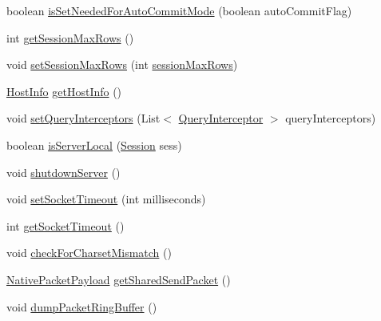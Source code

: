 \begin{DoxyCompactItemize}
\item 
boolean \mbox{\hyperlink{classcom_1_1mysql_1_1cj_1_1_native_session_a6c17459969e6753f0b81ebe4ad6dfeea}{is\+Set\+Needed\+For\+Auto\+Commit\+Mode}} (boolean auto\+Commit\+Flag)
\item 
int \mbox{\hyperlink{classcom_1_1mysql_1_1cj_1_1_native_session_acfb2e9bb55f978d62b41814adbaf940d}{get\+Session\+Max\+Rows}} ()
\item 
void \mbox{\hyperlink{classcom_1_1mysql_1_1cj_1_1_native_session_a2a00f7d68bbd14f1e9b1ab4509cef54b}{set\+Session\+Max\+Rows}} (int \mbox{\hyperlink{classcom_1_1mysql_1_1cj_1_1_core_session_a6206b6d3a13ba61a394fd6ab6e93eafc}{session\+Max\+Rows}})
\item 
\mbox{\hyperlink{classcom_1_1mysql_1_1cj_1_1conf_1_1_host_info}{Host\+Info}} \mbox{\hyperlink{classcom_1_1mysql_1_1cj_1_1_native_session_a9a6129d65239775a738e640addb8d9db}{get\+Host\+Info}} ()
\item 
void \mbox{\hyperlink{classcom_1_1mysql_1_1cj_1_1_native_session_acf6953e6fd07ccbc194907d725e84624}{set\+Query\+Interceptors}} (List$<$ \mbox{\hyperlink{interfacecom_1_1mysql_1_1cj_1_1interceptors_1_1_query_interceptor}{Query\+Interceptor}} $>$ query\+Interceptors)
\item 
boolean \mbox{\hyperlink{classcom_1_1mysql_1_1cj_1_1_native_session_a9364f1208646a5b6fb3ceda2cef15822}{is\+Server\+Local}} (\mbox{\hyperlink{interfacecom_1_1mysql_1_1cj_1_1_session}{Session}} sess)
\item 
void \mbox{\hyperlink{classcom_1_1mysql_1_1cj_1_1_native_session_a7237ecf5054050d24533806a4a548777}{shutdown\+Server}} ()
\item 
void \mbox{\hyperlink{classcom_1_1mysql_1_1cj_1_1_native_session_a021114685b1730924669be2122f6c53d}{set\+Socket\+Timeout}} (int milliseconds)
\item 
int \mbox{\hyperlink{classcom_1_1mysql_1_1cj_1_1_native_session_a65e529c9db707ecccd842853281963c8}{get\+Socket\+Timeout}} ()
\item 
void \mbox{\hyperlink{classcom_1_1mysql_1_1cj_1_1_native_session_a384334014fbd4629e94632d30618ef4f}{check\+For\+Charset\+Mismatch}} ()
\item 
\mbox{\hyperlink{classcom_1_1mysql_1_1cj_1_1protocol_1_1a_1_1_native_packet_payload}{Native\+Packet\+Payload}} \mbox{\hyperlink{classcom_1_1mysql_1_1cj_1_1_native_session_a992bfbb8f5cd5ba3bddcc850691ce4e3}{get\+Shared\+Send\+Packet}} ()
\item 
void \mbox{\hyperlink{classcom_1_1mysql_1_1cj_1_1_native_session_a7a51725820573809d0fe015fb790a9b3}{dump\+Packet\+Ring\+Buffer}} ()

\end{DoxyCompactItemize}
